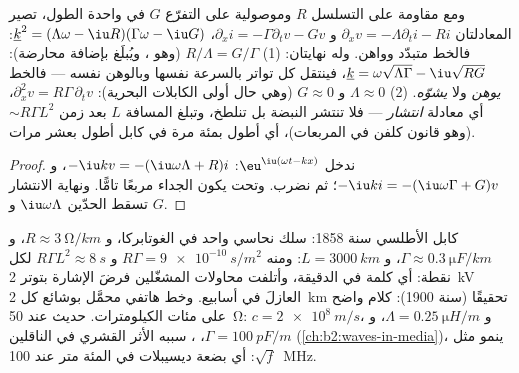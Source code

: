 \begin{proposition}\label{prop:b2:dispersion-wave-packets:lossy}
ومع مقاومة على التسلسل $R$ وموصولية على التفرّع $G$ في واحدة
الطول، تصير المعادلتان $\partial_xv = -\Lambda\partial_ti - Ri$ و $\partial_xi =
-\Gamma\partial_tv - Gv$،  $\underline k^2 = (\Lambda\omega -
\iu R)(\Gamma\omega - \iu G)$: فالخط متبدّد وواهن. وله نهايتان:
(1) $R/\Lambda = G/\Gamma$ (وهو ، ويُبلَغ بإضافة
محارضة): $\underline k = \omega\sqrt{\Lambda\Gamma} - \iu\sqrt{RG}$، فينتقل كل تواتر
بالسرعة نفسها وبالوهن نفسه --- فالخط \emph{يوهن} ولا
\emph{يشوّه}. (2) $\Lambda \approx 0$ و $G \approx 0$
(وهي حال أولى الكابلات البحرية): $\partial_x^2v = R\Gamma\,\partial_tv$، أي معادلة
\emph{انتشار} --- فلا تنتشر النبضة بل تنلطخ،
وتبلغ المسافة $L$ بعد زمن $\sim R\Gamma L^2$ (وهو قانون كلفن في
المربعات)، أي أطول بمئة مرة في كابل أطول بعشر مرات.
\end{proposition}

\begin{proof}
ندخل $\eu^{\iu(\omega t - kx)}$: $-\iu kv = -(\iu\omega\Lambda + R)i$، و $-\iu ki = -(\iu
\omega\Gamma + G)v$؛ ثم نضرب. وتحت  يكون الجداء
مربعًا تامًّا. ونهاية الانتشار تسقط الحدّين $\iu\omega\Lambda$ و $G$.
\end{proof}

\begin{example}\label{ex:b2:dispersion-wave-packets:cables}
كابل الأطلسي سنة 1858: سلك نحاسي واحد في الغوتابركا،
و $R \approx \qty{3}{\ohm/km}$، و $\Gamma \approx \qty{0.3}{\micro F/km}$، و $L = \qty{3000}{km}$:
ومنه $R\Gamma = \qty{9e-10}{s/m^2}$ و $R\Gamma L^2 \approx \qty{8}{s}$ لكل نقطة: أي كلمة في
الدقيقة، وأتلفت محاولات المشغّلين فرضَ الإشارة
بتوتر \qty{2}{kV} العازلَ في أسابيع. وخط هاتفي
محمَّل بوشائع كل \qty{2}{km} تحقيقًا 
(سنة 1900): كلام واضح على مئات الكيلومترات.  حديث عند \qty{50}{\ohm}:
$c = \qty{2e8}{m/s}$، و $\Lambda = \qty{0.25}{\micro H/m}$، و $\Gamma =
\qty{100}{pF/m}$، ، سببه الأثر القشري في
الناقلين (\cref{ch:b2:waves-in-media})، ينمو مثل $\sqrt f$: أي بضعة
ديسيبلات في المئة متر عند \qty{100}{MHz}.
\end{example}

